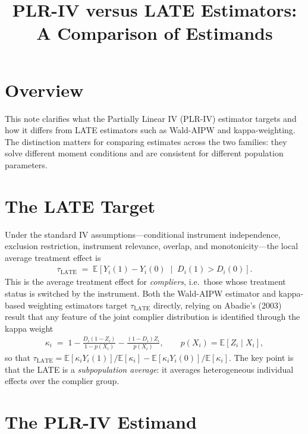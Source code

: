 \documentclass[12pt,a4paper]{article}
\title{\textbf{PLR-IV versus LATE Estimators:\\A Comparison of Estimands}}
\author{}
\date{}
\newcommand{\E}{\mathbb{E}}
\begin{document}
\maketitle
\thispagestyle{empty}

\section*{Overview}

This note clarifies what the Partially Linear IV (PLR-IV) estimator targets and how it
differs from LATE estimators such as Wald-AIPW and kappa-weighting.  The distinction
matters for comparing estimates across the two families: they solve different moment
conditions and are consistent for different population parameters.

\section{The LATE Target}

Under the standard IV assumptions---conditional instrument independence, exclusion
restriction, instrument relevance, overlap, and monotonicity---the local average treatment
effect is
\begin{align}
  \tau_{\mathrm{LATE}}
  \;=\;
  \E\!\left[Y_i(1)-Y_i(0)\;\middle|\;D_i(1)>D_i(0)\right].
  \label{eq:late}
\end{align}
This is the average treatment effect for \emph{compliers}, i.e.\ those whose treatment
status is switched by the instrument.  Both the Wald-AIPW estimator and kappa-based
weighting estimators \citep{abadie2003semiparametric} target $\tau_{\mathrm{LATE}}$
directly, relying on Abadie's (2003) result that any feature of the joint complier
distribution is identified through the kappa weight
\begin{align}
  \kappa_i
  \;=\;
  1
  -\frac{D_i(1-Z_i)}{1-p(X_i)}
  -\frac{(1-D_i)Z_i}{p(X_i)},
  \qquad
  p(X_i)=\E[Z_i\mid X_i],
\end{align}
so that $\tau_{\mathrm{LATE}} = \E[\kappa_i Y_i(1)]/\E[\kappa_i] -
\E[\kappa_i Y_i(0)]/\E[\kappa_i]$.  The key point is that the LATE is a
\emph{subpopulation average}: it averages heterogeneous individual effects over the
complier group.

\section{The PLR-IV Estimand}
\end{document}
